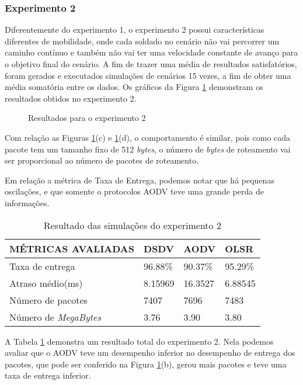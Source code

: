 \subsubsection{Experimento 2}
Diferentemente do experimento 1, o experimento 2 possui caracter\'isticas diferentes de mobilidade, onde cada soldado no cen\'ario n\~ao vai percorrer um caminho cont\'inuo e tamb\'em n\~ao vai ter uma velocidade constante de avan\c{c}o para o objetivo final do cen\'ario.
A fim de trazer uma m\'edia de resultados satisfat\'orios, foram gerados e executados simula\c{c}\~oes de cen\'arios 15 vezes, a fim de obter uma m\'edia somat\'oria entre os dados.
Os gr\'aficos da Figura \ref{fig:resulExp2} demonstram os resultados obtidos no experimento 2.

\begin{figure}[H]
	\centering
	\label{subfig:exp2Taxa}
	\label{subfig:exp2Late}
	\label{subfig:exp2Byte}
	\label{subfig:exp2Pkts}
	
	\caption{Resultados para o experimento 2}
	\label{fig:resulExp2}
\end{figure}

Com rela\c{c}\~ao as Figuras \ref{fig:resulExp2}(c) e \ref{fig:resulExp2}(d), o comportamento \'e similar, pois como cada pacote tem um tamanho fixo de 512 \textit{bytes}, o n\'umero de \textit{bytes} de roteamento vai ser proporcional ao n\'umero de pacotes de roteamento.

Em rela\c{c}\~ao a m\'etrica de Taxa de Entrega, podemos notar que h\'a pequenas oscila\c{c}\~oes, e que somente o protocolos AODV teve uma grande perda de informa\c{c}\~oes.

\begin{table}[H]
	\centering
	\caption{Resultado das simula\c{c}\~oes do experimento 2}
	\begin{tabular}{ | l | l | l | l | }
		\hline
		M\'ETRICAS AVALIADAS & DSDV & AODV & OLSR \\ \hline
		Taxa de entrega & 96.88\% & 90.37\% & 95.29\%  \\ \hline
		Atraso m\'edio(ms) & 8.15969 & 16.3527 & 6.88545  \\ \hline
		N\'umero de pacotes & 7407 & 7696 & 7483  \\ \hline
		N\'umero de \textit{MegaBytes} & 3.76 & 3.90 & 3.80  \\ \hline
	\end{tabular}
	\label{tabExp2Result}
\end{table}

A Tabela \ref{tabExp2Result} demonstra um resultado total do experimento 2. Nela podemos avaliar que o AODV teve um desempenho inferior no desempenho de entrega dos pacotes, que pode ser conferido na Figura \ref{fig:resulExp2}(b), gerou mais pacotes e teve uma taxa de entrega inferior.
